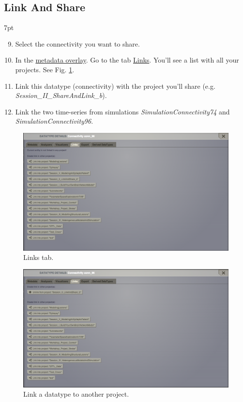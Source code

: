 \documentclass{tufte-handout}
\newenvironment{formal}{%
  \def\FrameCommand{%
    \hspace{1pt}%
    {\color{DarkBlue}\vrule width 2pt}%
    {\color{formalshade}\vrule width 4pt}%
    \colorbox{formalshade}%
  }%
  \MakeFramed{\advance\hsize-\width\FrameRestore}%
  \noindent\hspace{-4.55pt}%
  \begin{adjustwidth}{}{7pt}%
  \vspace{2pt}\vspace{2pt}%
}
{%
  \vspace{2pt}\end{adjustwidth}\endMakeFramed%
}
\begin{document}
\subsection{Link And Share}\label{sec:link_and_share}
\begin{formal}
\begin{enumerate}[resume]
\setcounter{enumi}{8}
\item Select the connectivity you want to share.
\item In the \underline{metadata overlay}. Go to the tab \underline{Links}. You'll see a list with all your projects. See Fig. \ref{fig:linkstab}.
\item Link this datatype (connectivity) with the project you'll share (e.g. \textit{Session\_II\_ShareAndLink\_b}).
\item Link the two time-series from simulations \textit{SimulationConnectivity74} and \textit{SimulationConnectivity96}.
\end{enumerate}
\end{formal} 

\begin{figure}[h]
  \includegraphics[width=\linewidth]{Handout_UI_LinkAndShare_LinksTab}%
  \caption{Links tab.}%
  \label{fig:linkstab}%
\end{figure}

\begin{figure}[h]
  \includegraphics[width=\linewidth]{Handout_UI_LinkAndShare_LinkedProject}%
  \caption{Link a datatype to another project.}%
  \label{fig:linkproject}%
\end{figure}
\end{document}
